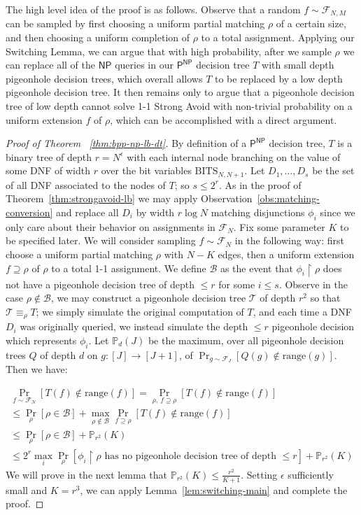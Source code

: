 \documentclass[11pt]{article}
\newcommand{\rng}{\mathrm{range}}
\begin{document}
The high level idea of the proof is as follows. Observe that a random $f \sim \mathcal{F}_{N,M}$ can be sampled by first choosing a uniform partial matching $\rho$ of a certain size, and then choosing a uniform completion of $\rho$ to a total assignment. Applying our Switching Lemma, we can argue that with high probability, after we sample $\rho$ we can replace all of the $\mathsf{NP}$ queries in our $\mathsf{P^{NP}}$ decision tree $T$ with small depth pigeonhole decision trees, which overall allows $T$ to be replaced by a low depth pigeonhole decision tree. It then remains only to argue that a pigeonhole decision tree of low depth cannot solve 1-1 Strong Avoid with non-trivial probability on a uniform extension $f$ of $\rho$, which can be accomplished with a direct argument.
\begin{proof}[Proof of Theorem ~\ref{thm:bpp-np-lb-dt}]
By definition of a $\mathsf{P^{NP}}$ decision tree, $T$ is a binary tree of depth $r = N^{\epsilon}$ with each internal node branching on the value of some DNF of width $r$ over the bit variables $\mathrm{BITS}_{N,N+1}$. Let $D_1,\ldots,D_s$ be the set of all DNF associated to the nodes of $T$; so $s \leq 2^r$. As in the proof of Theorem~\ref{thm:strongavoid-lb} we may apply Observation~\ref{obs:matching-conversion} and replace all $D_i$ by width $r\log N$ matching disjunctions $\phi_i$ since we only care about their behavior on assignments in $\mathcal{F}_N$. Fix some parameter $K$ to be specified later. We will consider sampling $f \sim \mathcal{F}_N$ in the following way: first choose a uniform partial matching $\rho$ with $N-K$ edges, then a uniform extension $f \supseteq \rho$ of $\rho$ to a total 1-1 assignment. We define $\mathcal{B}$ as the event that $\phi_i \upharpoonright \rho$ does not have a pigeonhole decision tree of depth $\leq r$ for some $i \leq s$. Observe in the case $\rho \notin \mathcal{B}$, we may construct a pigeonhole decision tree $\mathcal{T}$ of depth $r^2$ so that $\mathcal{T} \equiv_{\rho} T$; we simply simulate the original computation of $T$, and each time a DNF $D_i$ was originally queried, we instead simulate the depth $\leq r$ pigeonhole decision which represents $\phi_i$. Let $\mathbb{P}_d(J)$ be the maximum, over all pigeonhole decision trees $Q$ of depth $d$ on $g: [J] \to [J+1]$, of $\Pr_{g \sim \mathcal{F}_J}[Q(g) \notin \rng(g)]$. Then we have: 

\begin{gather*}
\Pr_{f \sim \mathcal{F}_N} [T(f) \notin \rng(f)] = \Pr_{\rho,~f \supseteq \rho } [T(f) \notin \rng(f)] \\ \leq \Pr_{\rho}[\rho \in \mathcal{B}] + \max_{\rho \notin \mathcal{B}}\Pr_{f \supseteq \rho}[T(f) \notin \rng(f)]\\
\leq \Pr_{\rho}[\rho \in \mathcal{B}] + \mathbb{P}_{r^2}(K)\\
\leq 2^r \max_i \Pr_{\rho}[\phi_i\upharpoonright \rho \text{ has no pigeonhole decision tree of depth } \leq r] + \mathbb{P}_{r^2}(K)
\end{gather*}
We will prove in the next lemma that $\mathbb{P}_{r^2}(K) \leq \frac{r^2}{K+1}$. Setting $\epsilon$ sufficiently small and $K = r^3$, we can apply Lemma~\ref{lem:switching-main} and complete the proof.
\end{proof}
\end{document}

